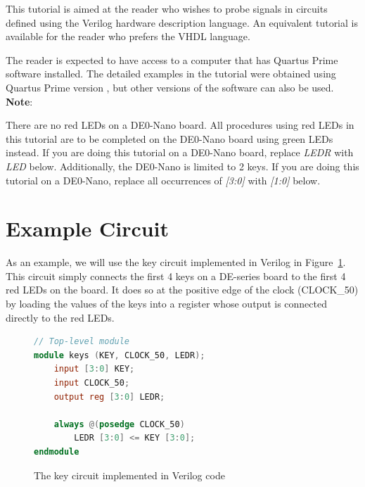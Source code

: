 \documentclass[11pt, twoside, pdftex]{article}
\begin{document}
This tutorial is aimed at the reader who wishes to probe signals in circuits defined
using the Verilog hardware description language. An equivalent tutorial is
available for the reader who prefers the VHDL language.
   
\noindent
The reader is expected to have access to a computer that has Quartus Prime software installed.
The detailed examples in the tutorial were obtained using Quartus Prime version \versnum, 
but other versions of the software can also be used. 
\\

{\bf Note}:

There are no red LEDs on a DE0-Nano board. All procedures using red LEDs in this tutorial are to be completed on the DE0-Nano board using green LEDs instead.
If you are doing this tutorial on a DE0-Nano board, replace {\it LEDR} with {\it LED} below.
Additionally, the DE0-Nano is limited to 2 keys. If you are doing this tutorial on a DE0-Nano, replace all occurrences of {\it [3:0]} with {\it [1:0]} below.

\section{Example Circuit}
As an example, we will use the key circuit implemented in Verilog in Figure~\ref{fig:1}. This circuit simply connects
the first 4 keys on a DE-series board to the first 4 red LEDs on the board. It does so at the
positive edge of the clock (CLOCK\_50) by loading the values of the keys into a register
whose output is connected directly to the red LEDs. 
\begin{figure}[H]
\begin{lstlisting}[language=Verilog, xleftmargin=.3\textwidth]
// Top-level module
module keys (KEY, CLOCK_50, LEDR);
    input [3:0] KEY;
    input CLOCK_50;
    output reg [3:0] LEDR;

    always @(posedge CLOCK_50)
        LEDR [3:0] <= KEY [3:0];
endmodule
\end{lstlisting}
     \caption{The key circuit implemented in Verilog code} 
	 \label{fig:1}
\end{figure}
\end{document}
